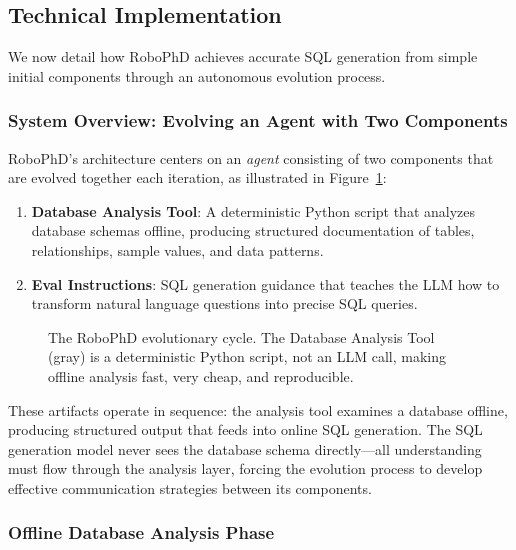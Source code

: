 \documentclass{article}
\begin{document}
\subsection{Technical Implementation}
\label{subsec:technical}

We now detail how RoboPhD achieves accurate SQL generation from simple initial components through an autonomous evolution process.

\subsubsection{System Overview: Evolving an Agent with Two Components}

RoboPhD's architecture centers on an \textit{agent} consisting of two components that are evolved together each iteration, as illustrated in Figure~\ref{fig:bird-flowchart}:

\begin{enumerate}
    \item \textbf{Database Analysis Tool}: A deterministic Python script that analyzes database schemas offline, producing structured documentation of tables, relationships, sample values, and data patterns.
    \item \textbf{Eval Instructions}: SQL generation guidance that teaches the LLM how to transform natural language questions into precise SQL queries.
\end{enumerate}

\begin{figure}[ht]
    \centering
    
    \caption{The RoboPhD evolutionary cycle. The Database Analysis Tool (gray) is a deterministic Python script, not an LLM call, making offline analysis fast, very cheap, and reproducible.} 
    \label{fig:bird-flowchart}
\end{figure}

These artifacts operate in sequence: the analysis tool examines a database offline, producing structured output that feeds into online SQL generation. The SQL generation model never sees the database schema directly---all understanding must flow through the analysis layer, forcing the evolution process to develop effective communication strategies between its components.

\subsubsection{Offline Database Analysis Phase}\label{subsubsec:database-analysis}
\end{document}
